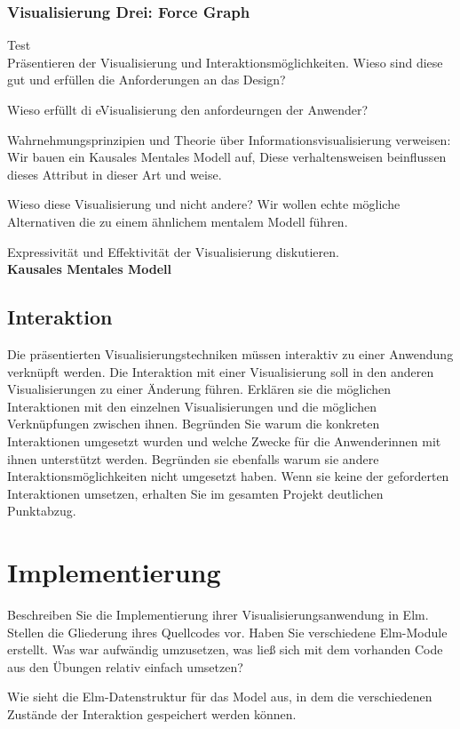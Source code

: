 \documentclass[usegeometry=true]{scrartcl}
\begin{document}
\subsubsection{Visualisierung Drei: Force Graph} Test\\
Präsentieren der Visualisierung und Interaktionsmöglichkeiten. 
Wieso sind diese gut und erfüllen die Anforderungen an das Design?

Wieso erfüllt di eVisualisierung den anfordeurngen der Anwender?

Wahrnehmungsprinzipien und Theorie über Informationsvisualisierung verweisen: Wir bauen ein 
Kausales Mentales Modell auf, Diese verhaltensweisen beinflussen dieses Attribut in dieser Art und weise.

Wieso diese Visualisierung und nicht andere? Wir wollen echte mögliche 
Alternativen die zu einem ähnlichem mentalem Modell führen.

Expressivität und Effektivität der Visualisierung diskutieren.\\


\textbf{Kausales Mentales Modell}


\subsection{Interaktion}
Die präsentierten Visualisierungstechniken müssen interaktiv zu einer Anwendung verknüpft werden.
Die Interaktion mit einer Visualisierung soll in den anderen Visualisierungen zu einer Änderung führen. 
Erklären sie die möglichen Interaktionen mit den einzelnen Visualisierungen und die möglichen Verknüpfungen zwischen ihnen.
Begründen Sie warum die konkreten Interaktionen umgesetzt wurden und welche Zwecke für die Anwenderinnen mit ihnen unterstützt werden.
Begründen sie ebenfalls warum sie andere Interaktionsmöglichkeiten nicht umgesetzt haben.
Wenn sie keine der geforderten Interaktionen umsetzen, erhalten Sie im gesamten Projekt deutlichen Punktabzug. 

\section{Implementierung}
Beschreiben Sie die Implementierung ihrer Visualisierungsanwendung in Elm. Stellen die Gliederung ihres Quellcodes vor.
 Haben Sie verschiedene Elm-Module erstellt. Was war aufwändig umzusetzen, 
 was ließ sich mit dem vorhanden Code aus den Übungen relativ einfach umsetzen? 

Wie sieht die Elm-Datenstruktur für das Model aus, in dem die verschiedenen Zustände der Interaktion gespeichert werden können.
\end{document}
